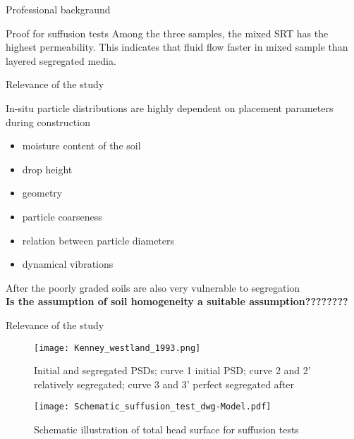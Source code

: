 \documentclass[10pt,xcolor=dvipsnames]{beamer}
\begin{document}
{\begin{frame}{Professional backgraund}
\begin{frame}{Proof for suffusion tests }
Among the three samples, the mixed SRT
has the highest permeability. This indicates that fluid flow faster in mixed sample
than layered segregated media.
\end{frame}


{
\usenavigationsymbolstemplate{}

%
%
\begin{frame}[fragile]{Relevance of the study} 

In-situ particle distributions are highly dependent on placement parameters during construction 
\begin{itemize}
\item moisture content of the soil
\item drop height\item geometry
\item particle coarseness
\item relation between particle diameters
\item dynamical vibrations
\end{itemize}
After \cite{KenneyWestland:1993} the poorly graded soils are also very vulnerable to segregation\\

\alert{\textbf{Is the assumption of soil homogeneity a suitable assumption????????} }
\end{frame}
}

\begin{frame}[fragile]{Relevance of the study}
\begin{figure}[h]
	\centering
		\texttt{[image: Kenney\_westland\_1993.png]}
		       \caption{Initial and segregated PSDs;  
        curve 1 initial PSD;
        curve 2 and 2' relatively segregated;
        curve 3 and 3' perfect segregated after \citep{KenneyWestland:1993}}
        \label{kenwestseg93}
\end{figure}
\end{frame}


\begin{frame}%
\begin{figure}[H] 
   \centering
\texttt{[image: Schematic\_suffusion\_test\_dwg-Model.pdf]} 
        \caption{Schematic illustration of total head surface for suffusion tests}
        \label{fig:suffusion_test_total_head_loss}
\end{figure}

\end{frame}



\end{frame}}
\end{document}
